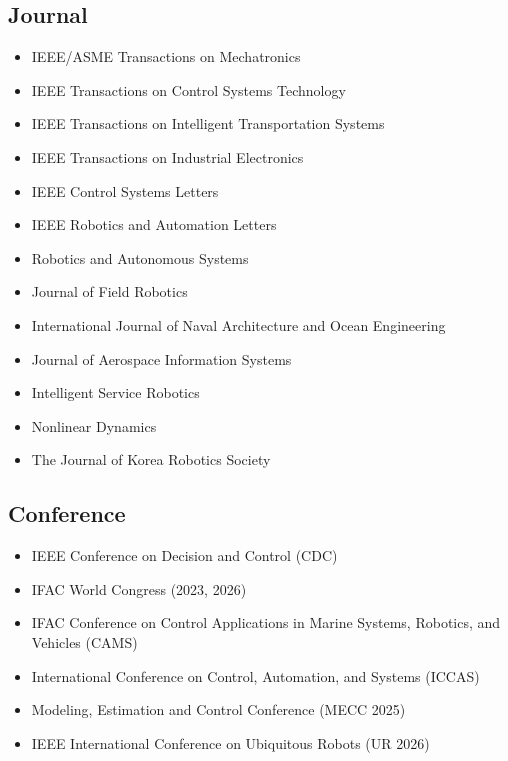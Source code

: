\documentclass[10pt, letterpaper]{article}
\begin{document}
    \subsection{Journal}
    \begin{itemize}                 
         \item IEEE/ASME Transactions on Mechatronics
         \item IEEE Transactions on Control Systems Technology
         \item IEEE Transactions on Intelligent Transportation Systems
         \item IEEE Transactions on Industrial Electronics
         \item IEEE Control Systems Letters
         \item IEEE Robotics and Automation Letters
         \item Robotics and Autonomous Systems
         \item Journal of Field Robotics
         \item International Journal of Naval Architecture and Ocean Engineering
         \item Journal of Aerospace Information Systems
         \item Intelligent Service Robotics
         \item Nonlinear Dynamics
         \item The Journal of Korea Robotics Society
    \end{itemize}                 
    \subsection{Conference}
    \begin{itemize}                 
         \item IEEE Conference on Decision and Control (CDC)
         \item IFAC World Congress (2023, 2026)
         \item IFAC Conference on Control Applications in Marine Systems, Robotics, and Vehicles (CAMS)
         \item International Conference on Control, Automation, and Systems (ICCAS)
         \item Modeling, Estimation and Control Conference (MECC 2025)
         \item IEEE International Conference on Ubiquitous Robots (UR 2026)
    \end{itemize}   
\end{document}
